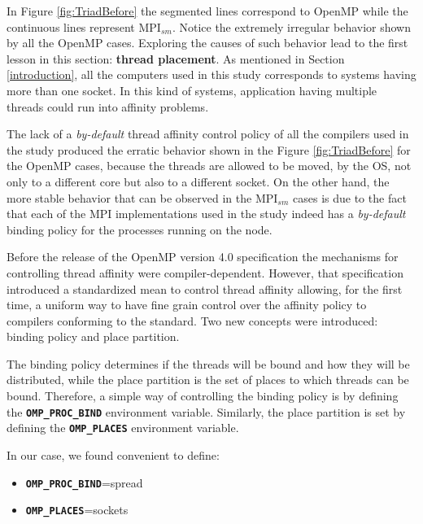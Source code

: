In Figure \ref{fig:TriadBefore} the segmented lines correspond to OpenMP while the continuous lines represent MPI$_{sm}$. Notice the extremely irregular behavior shown by all the OpenMP cases. Exploring the causes of such behavior lead to the first lesson in this section: \textbf{thread placement}. As mentioned in Section \ref{introduction}, all the computers used in this study corresponds to systems having more than one socket. In this kind of systems, application having multiple threads could run into affinity problems.

\medskip

The lack of a \emph{by-default} thread affinity control policy of all the compilers used in the study produced the erratic behavior shown in the Figure \ref{fig:TriadBefore} for the OpenMP cases, because the threads are allowed to be moved, by the OS, not only to a different core but also to a different socket. On the other hand, the more stable behavior that can be observed in the MPI$_{sm}$ cases is due to the fact that each of the MPI implementations used in the study indeed has a \emph{by-default} binding policy for the processes running on the node.

\medskip


Before the release of the OpenMP version 4.0 specification the mechanisms for controlling thread affinity were compiler-dependent. However, that specification introduced a standardized mean to control thread affinity allowing, for the first time, a uniform way to have fine grain control over the affinity policy to compilers conforming to the standard. Two new concepts were introduced: binding policy and place partition.

\medskip

The binding policy determines if the threads will be bound and how they will be distributed, while the place partition is the set of places to which threads can be bound. Therefore, a simple way of controlling the binding policy is by defining the \textbf{\texttt{OMP\_PROC\_BIND}} environment variable. Similarly, the place partition is set by defining the \textbf{\texttt{OMP\_PLACES}} environment variable.

\medskip

In our case, we found convenient to define:

\begin{itemize} 

\item \textbf{\texttt{OMP\_PROC\_BIND}}=spread 

\item \textbf{\texttt{OMP\_PLACES}}=sockets

\end{itemize}

